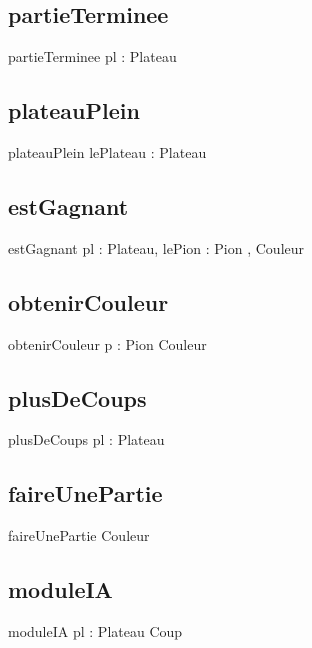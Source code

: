 \documentclass{article}
\begin{document}
	\subsection{partieTerminee}
		\begin{algorithme}
			\signaturefonction
				{partieTerminee}
				{pl : Plateau}
				{\booleen}
		\end{algorithme}
	\subsection{plateauPlein}
		\begin{algorithme}
			\signaturefonction
				{plateauPlein}
				{lePlateau : Plateau}
				{\booleen}
		\end{algorithme}
	\subsection{estGagnant}
		\begin{algorithme}
			\signaturefonction
				{estGagnant}
				{pl : Plateau, lePion : Pion}
				{\booleen, Couleur}
		\end{algorithme}
	\subsection{obtenirCouleur}
		\begin{algorithme}
			\signaturefonction
				{obtenirCouleur}
				{p : Pion}
				{Couleur}
		\end{algorithme}
	\subsection{plusDeCoups}
		\begin{algorithme}
			\signaturefonction
				{plusDeCoups}
				{pl : Plateau}
				{\booleen}
		\end{algorithme}
	\subsection{faireUnePartie}
\begin{algorithme}
	\signaturefonction
	{faireUnePartie}
	{}
	{Couleur}
\end{algorithme}
	\subsection{moduleIA}
\begin{algorithme}
	\signaturefonction
	{moduleIA}
	{pl : Plateau}
	{Coup}
\end{algorithme}
\end{document}
